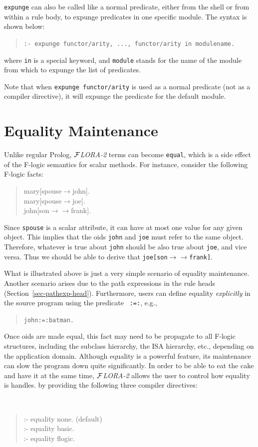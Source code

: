 \documentclass[11pt]{article}
\newcommand{\fd}{\ensuremath{{\rightarrow}}}                   %
\newcommand{\mvd}{\ensuremath{{\rightarrow\!\!\!\!\rightarrow}}}  %
\newcommand{\FLORA}{{\mbox{${\cal F}${\small\it LORA}\rm\emph{-2}}}\xspace}
\newcommand{\fl}{\mbox{F-logic}\xspace}
\begin{document}
\noindent
{\tt expunge} can also be called like a normal predicate,
either from the shell or from within a rule body, to expunge
predicates in one specific module. The syntax is shown below:
\begin{quote}
\verb!:- expunge functor/arity, ..., functor/arity in modulename.!
\end{quote}
where {\tt in} is a special keyword, and {\tt module} stands for the
name of the module from which to expunge the list of predicates.

Note that when {\tt expunge functor/arity} is used as a normal predicate
(not as a compiler directive), it will expunge the predicate for the
default module.




\section{Equality Maintenance}\label{sec-eqmaintain}


Unlike regular Prolog, \FLORA terms can become {\tt equal}, which is a side
effect of the \fl semantics for scalar methods.  For instance, consider the
following \fl facts:
\begin{quote}
mary[spouse{\fd}john]. \\
mary[spouse{\fd}joe]. \\
john[son{\mvd}frank].
\end{quote}
Since {\tt spouse} is a scalar attribute, it can have at most one value for
any given object. This implies that the oids {\tt john} and {\tt joe} must
refer to the same object. Therefore, whatever is true about {\tt john}
should be also true about {\tt joe}, and vice versa.  Thus we should be
able to derive that {\tt joe[son{\mvd}frank]}.

What is illustrated above is just a very simple scenario of equality
maintenance. Another scenario arises due to the path expressions in the
rule heads (Section~\ref{sec-pathexp-head}).  Furthermore, users can define
equality \emph{explicitly} in the source program using the predicate {\tt
  :=:}, e.g.,
\begin{quote}
\verb|john:=:batman.|
\end{quote}

Once oids are made equal, this fact may need to be propagate to all \fl
structures, including the subclass hierarchy, the ISA hierarchy, etc.,
depending on the application domain. Although equality is a powerful
feature, its maintenance can slow the program down quite significantly.
In order to be able to eat the cake and have it at the same time, \FLORA
allows the user to control how equality is handles.
by providing the following three compiler directives:
{\tt
\begin{quote}
:- equality none.  (default)\\
:- equality basic.\\
:- equality flogic.
\end{quote}
}
\end{document}
